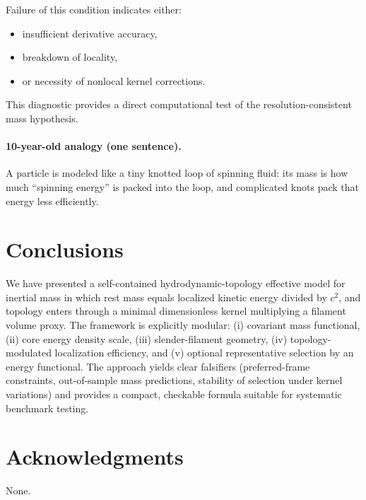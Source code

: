 \documentclass[11pt]{article}
\theoremstyle{definition}
\theoremstyle{plain}
\theoremstyle{remark}
\begin{document}
        Failure of this condition indicates either:

        \begin{itemize}
            \item insufficient derivative accuracy,
            \item breakdown of locality,
            \item or necessity of nonlocal kernel corrections.
        \end{itemize}

        This diagnostic provides a direct computational test
        of the resolution-consistent mass hypothesis.


        \paragraph{10-year-old analogy (one sentence).}
            A particle is modeled like a tiny knotted loop of spinning fluid: its mass is how much ``spinning energy'' is packed into the loop, and complicated knots pack that energy less efficiently.

        \section{Conclusions}
        We have presented a self-contained hydrodynamic-topology effective model for inertial mass in which rest mass equals localized kinetic energy divided by $c^2$, and topology enters through a minimal dimensionless kernel multiplying a filament volume proxy. The framework is explicitly modular: (i) covariant mass functional, (ii) core energy density scale, (iii) slender-filament geometry, (iv) topology-modulated localization efficiency, and (v) optional representative selection by an energy functional. The approach yields clear falsifiers (preferred-frame constraints, out-of-sample mass predictions, stability of selection under kernel variations) and provides a compact, checkable formula suitable for systematic benchmark testing.

        \section*{Acknowledgments}
        None.
\end{document}

